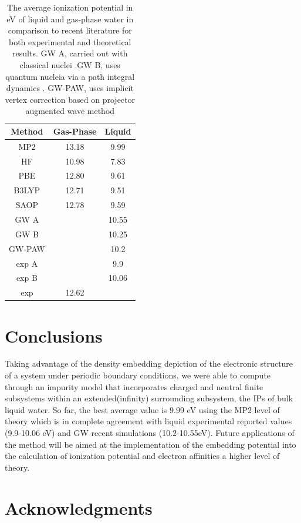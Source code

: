 \documentclass[12pt,a4paper]{article}
\begin{document}
\begin{table}[!ht]
 \begin{center}
  \setlength{\tabcolsep}{18pt}
  \caption{The average ionization potential in eV of liquid and gas-phase water in comparison to recent literature for both experimental and theoretical results. GW A, carried out with classical nuclei \cite{gaiduk2018electron}.GW B, uses quantum nucleia via a path integral dynamics \cite{gaiduk2018electron}. GW-PAW, uses implicit vertex correction based on projector augmented wave method\cite{ziaei2018probing}}
  \label{tab:table1}
  \begin{tabular}{ ccc }
  \hline
   Method &Gas-Phase& Liquid\\
  \hline
   MP2&13.18&9.99\\
   HF&10.98& 7.83\\
   PBE&12.80&9.61\\
   B3LYP&12.71&9.51\\
   SAOP&12.78&9.59\\
   GW A \cite{gaiduk2018electron} & &10.55\\
   GW B\cite{gaiduk2018electron} & & 10.25\\
   GW-PAW\cite{ziaei2018probing} & & 10.2 \\
   exp A \cite{winter2004full} & & 9.9 \\
   exp B \cite{delahay1981chem} & & 10.06 \\
   exp \cite{nist2015nist} &12.62 & \\
  \hline
  \end{tabular}
 \end{center}
\end{table}

\section{Conclusions}

Taking advantage of the density embedding depiction of the electronic structure of a system under periodic boundary conditions, we were able to 
compute through an impurity model that incorporates charged and neutral finite subsystems within an extended(infinity) surrounding subsystem, 
the IPs of bulk liquid water. So far, the best average value is 9.99 eV using the MP2 level of theory which is in complete agreement with liquid
experimental reported values (9.9-10.06 eV) and GW recent simulations (10.2-10.55eV). Future applications of the method will be aimed at the
implementation of the embedding potential into the calculation of ionization potential and electron affinities a higher level of theory. 

\nocite{*}

\printbibliography

\section{Acknowledgments}
\end{document}
